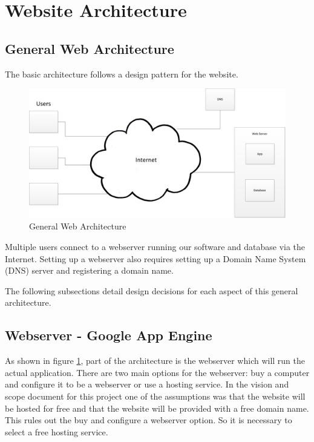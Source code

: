 \documentclass{article}
\begin{document}
\section{Website Architecture}

\subsection{General Web Architecture}

The basic architecture follows a design pattern for the website.

\FloatBarrier
\begin{figure}[h!]
\centering
\includegraphics[scale=.6]{img/generalWebArchitecture}
\caption{General Web Architecture}
\label{fig:generalWebArchitecture}
\end{figure}
\FloatBarrier

Multiple users connect to a webserver running our software and database via the Internet.
Setting up a webserver also requires setting up a Domain Name System (DNS) server and registering a domain
name.

The following subsections detail design decisions for each aspect of this general architecture.

\subsection{Webserver - Google App Engine}

As shown in figure \ref{fig:generalWebArchitecture}, part of the architecture is the webserver which will run the actual application. There are two main options
for the webserver: buy a computer and configure it to be a webserver or use a hosting service. In the vision and scope document for this project
one of the assumptions was that the website will be hosted for free and that the website will be provided with a free
domain name. \cite{schwab_apo_2012} This rules out the buy and configure a webserver option. So it is necessary to select a free hosting service.
\end{document}
